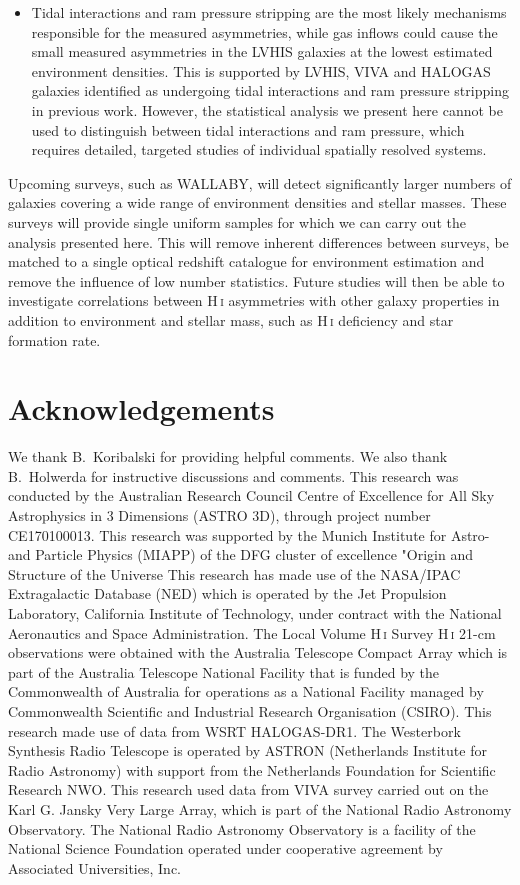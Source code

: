 \documentclass[fleqn,usenatbib]{mnras}
\begin{document}
\begin{itemize}
    \item Tidal interactions and ram pressure stripping are the most likely mechanisms responsible for the measured asymmetries, while gas inflows could cause the small measured asymmetries in the LVHIS galaxies at the lowest estimated environment densities. This is supported by LVHIS, VIVA and HALOGAS galaxies identified as undergoing tidal interactions and ram pressure stripping in previous work. However, the statistical analysis we present here cannot be used to distinguish between tidal interactions and ram pressure, which requires detailed, targeted studies of individual spatially resolved systems.
\end{itemize}

Upcoming surveys, such as WALLABY, will detect significantly larger numbers of galaxies covering a wide range of environment densities and stellar masses. These surveys will provide single uniform samples for which we can carry out the analysis presented here. This will remove inherent differences between surveys, be matched to a single optical redshift catalogue for environment estimation and remove the influence of low number statistics. Future studies will then be able to investigate correlations between H\,\textsc{i} asymmetries with other galaxy properties in addition to environment and stellar mass, such as H\,\textsc{i} deficiency and star formation rate.

\section*{Acknowledgements}

We thank B.~Koribalski for providing helpful comments. We also thank B.~Holwerda for instructive discussions and comments. This research was conducted by the Australian Research Council Centre of Excellence for All Sky Astrophysics in 3 Dimensions (ASTRO 3D), through project number CE170100013. This research was supported by the Munich Institute for Astro- and Particle Physics (MIAPP) of the DFG cluster of excellence "Origin and Structure of the Universe This research has made use of the NASA/IPAC Extragalactic Database (NED) which is operated by the Jet Propulsion Laboratory, California Institute of Technology, under contract with the National Aeronautics and Space Administration. The Local Volume H\,\textsc{i} Survey H\,\textsc{i} 21-cm observations were obtained with the Australia Telescope Compact Array which is part of the Australia Telescope National Facility that is funded by the Commonwealth of Australia for operations as a National Facility managed by Commonwealth Scientific and Industrial Research Organisation (CSIRO). This research made use of data from WSRT HALOGAS-DR1. The Westerbork Synthesis Radio Telescope is operated by ASTRON (Netherlands Institute for Radio Astronomy) with support from the Netherlands Foundation for Scientific Research NWO. This research used data from VIVA survey carried out on the Karl G. Jansky Very Large Array, which is part of the National Radio Astronomy Observatory. The National Radio Astronomy Observatory is a facility of the National Science Foundation operated under cooperative agreement by Associated Universities, Inc.
\end{document}

